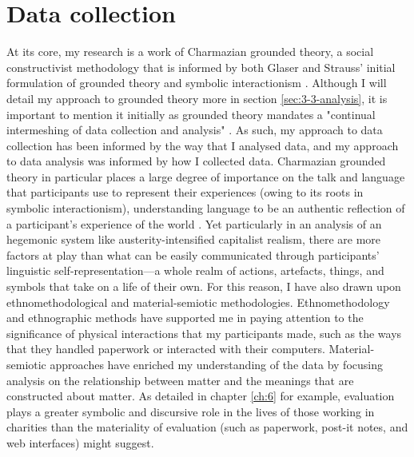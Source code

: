 \section{Data collection}
\label{sec:3-2-collection}
At its core, my research is a work of Charmazian grounded theory, a social constructivist methodology that is informed by both Glaser and Strauss' initial formulation of grounded theory and symbolic interactionism \citep{charmaz_constructing_2006}. Although I will detail my approach to grounded theory more in section \ref{sec:3-3-analysis}, it is important to mention it initially as grounded theory mandates a "continual intermeshing of data collection and analysis" \citep[p. 73]{glaser_discovery_2009}.  As such, my approach to data collection has been informed by the way that I analysed data, and my approach to data analysis was informed by how I collected data. Charmazian grounded theory in particular places a large degree of importance on the talk and language that participants use to represent their experiences (owing to its roots in symbolic interactionism), understanding language to be an authentic reflection of a participant's experience of the world \citep{charmaz_constructing_2006, mead_mind_2015}. Yet particularly in an analysis of an hegemonic system like austerity-intensified capitalist realism, there are more factors at play than what can be easily communicated through participants' linguistic self-representation—a whole realm of actions, artefacts, things, and symbols that take on a life of their own. For this reason, I have also drawn upon ethnomethodological and material-semiotic methodologies. Ethnomethodology and ethnographic methods have supported me in paying attention to the significance of physical interactions that my participants made, such as the ways that they handled paperwork or interacted with their computers. Material-semiotic approaches have enriched my understanding of the data by focusing analysis on the relationship between matter and the meanings that are constructed about matter. As detailed in chapter \ref{ch:6} for example, evaluation plays a greater symbolic and discursive role in the lives of those working in charities than the materiality of evaluation (such as paperwork, post-it notes, and web interfaces) might suggest. 

